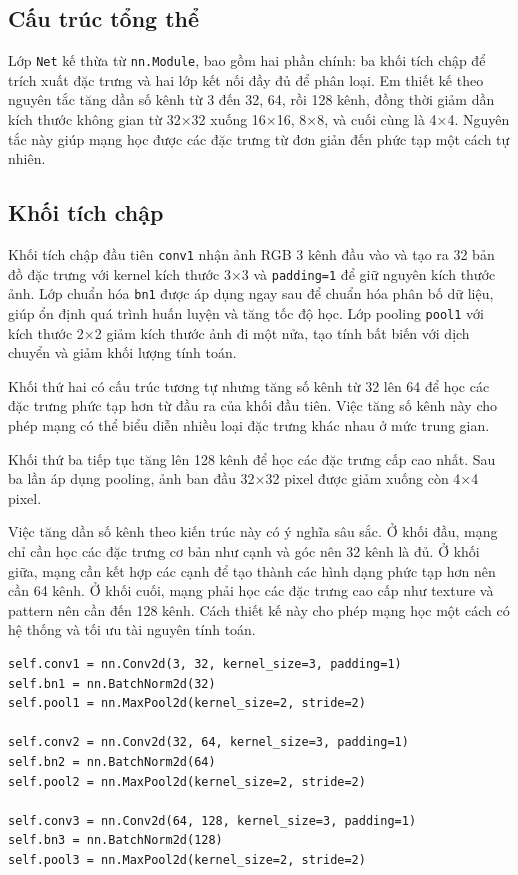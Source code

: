 \documentclass[12pt, a4paper, openany]{report}
\begin{document}
\subsection{Cấu trúc tổng thể}
Lớp \texttt{Net} kế thừa từ \texttt{nn.Module}, bao gồm hai phần chính: ba khối tích chập để trích xuất đặc trưng và hai lớp kết nối đầy đủ để phân loại. Em thiết kế theo nguyên tắc tăng dần số kênh từ 3 đến 32, 64, rồi 128 kênh, đồng thời giảm dần kích thước không gian từ 32×32 xuống 16×16, 8×8, và cuối cùng là 4×4. Nguyên tắc này giúp mạng học được các đặc trưng từ đơn giản đến phức tạp một cách tự nhiên.

\subsection{Khối tích chập}
Khối tích chập đầu tiên \texttt{conv1} nhận ảnh RGB 3 kênh đầu vào và tạo ra 32 bản đồ đặc trưng với kernel kích thước 3×3 và \texttt{padding=1} để giữ nguyên kích thước ảnh. Lớp chuẩn hóa \texttt{bn1} được áp dụng ngay sau để chuẩn hóa phân bố dữ liệu, giúp ổn định quá trình huấn luyện và tăng tốc độ học. Lớp pooling \texttt{pool1} với kích thước 2×2 giảm kích thước ảnh đi một nửa, tạo tính bất biến với dịch chuyển và giảm khối lượng tính toán. 

Khối thứ hai có cấu trúc tương tự nhưng tăng số kênh từ 32 lên 64 để học các đặc trưng phức tạp hơn từ đầu ra của khối đầu tiên. Việc tăng số kênh này cho phép mạng có thể biểu diễn nhiều loại đặc trưng khác nhau ở mức trung gian.

Khối thứ ba tiếp tục tăng lên 128 kênh để học các đặc trưng cấp cao nhất. Sau ba lần áp dụng pooling, ảnh ban đầu 32×32 pixel được giảm xuống còn 4×4 pixel. 

Việc tăng dần số kênh theo kiến trúc này có ý nghĩa sâu sắc. Ở khối đầu, mạng chỉ cần học các đặc trưng cơ bản như cạnh và góc nên 32 kênh là đủ. Ở khối giữa, mạng cần kết hợp các cạnh để tạo thành các hình dạng phức tạp hơn nên cần 64 kênh. Ở khối cuối, mạng phải học các đặc trưng cao cấp như texture và pattern nên cần đến 128 kênh. Cách thiết kế này cho phép mạng học một cách có hệ thống và tối ưu tài nguyên tính toán.

\begin{verbatim}
self.conv1 = nn.Conv2d(3, 32, kernel_size=3, padding=1)
self.bn1 = nn.BatchNorm2d(32)
self.pool1 = nn.MaxPool2d(kernel_size=2, stride=2)

self.conv2 = nn.Conv2d(32, 64, kernel_size=3, padding=1)
self.bn2 = nn.BatchNorm2d(64)
self.pool2 = nn.MaxPool2d(kernel_size=2, stride=2)

self.conv3 = nn.Conv2d(64, 128, kernel_size=3, padding=1)
self.bn3 = nn.BatchNorm2d(128)
self.pool3 = nn.MaxPool2d(kernel_size=2, stride=2)
\end{verbatim}
\end{document}
